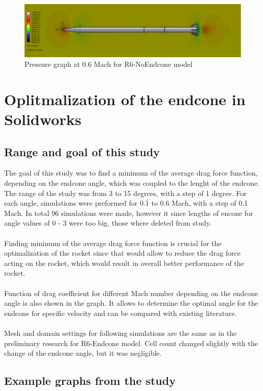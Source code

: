 \documentclass{article}
\begin{document}
\begin{figure}[H]
    \centering
    \includegraphics[width=\textwidth]{../data/R6-NoEndcone-Solid/konospeedoatode.png}
    \caption{Pressure graph at 0.6 Mach for R6-NoEndcone model}
\end{figure}



\section{Oplitmalization of the endcone in Solidworks}
\subsection{Range and goal of this study}
The goal of this study was to find a minimum of the average drag force function, depending on
the endcone angle, which was coupled to the lenght of the endcone. The range of the
study was from 3 to 15 degrees, with a step of 1 degree. For each angle, simulations were preformed for 
0.1 to 0.6 Mach, with a step of 0.1 Mach. In total 96 simulations were made, however it since 
lengths of encone for angle values of 0 - 3 were too big, those where deleted from study.\\\\
Finding minimum of the average drag force function is crucial for the optimalization of the rocket
since that would allow to reduce the drag force acting on the rocket, which would result in
overall better performance of the rocket.\\\\
Function of drag coefficient for different Mach number depending on the endcone angle is also 
shown in the graph. It allows to determine the optimal angle for the endcone for specific
velocity and can be compared with existing literature.\\\\
Mesh and domain settings for following simulations are the same as in the preliminary research for
R6-Endcone model. Cell count changed slightly with the change of the endcone angle, but it was
negligible.

\subsection{Example graphs from the study}
\end{document}
